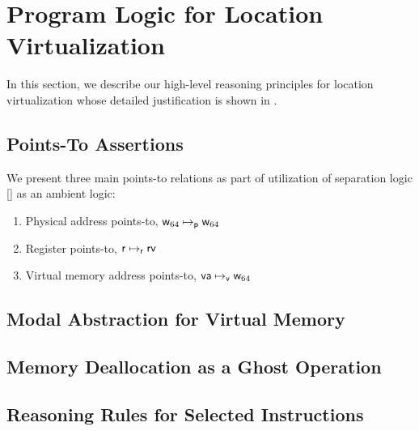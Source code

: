 \section{Program Logic for Location Virtualization}
\label{sec:logic}
In this section, we describe our high-level reasoning principles for location virtualization whose detailed justification is shown in . 
\subsection{Points-To Assertions}
\label{sec:pointsto}

We present three main points-to relations as part of utilization of separation logic \ref{} as an ambient logic:
\begin{enumerate}
\item Physical address points-to, $\mathsf{w}_{64}\mapsto_{\mathsf{p}}\mathsf{w}_{64}$
\item Register points-to, $\mathsf{r}\mapsto_{\mathsf{r}}\mathsf{rv}$
\item Virtual memory address points-to, $\mathsf{va}\mapsto_{\mathsf{v}}\mathsf{w}_{64}$
\end{enumerate}



\subsection{Modal Abstraction for Virtual Memory}
\label{sec:credits}

\subsection{Memory Deallocation as a Ghost Operation}
\label{sec:free}

\subsection{Reasoning Rules for Selected Instructions}
\label{sec:reasoning}



